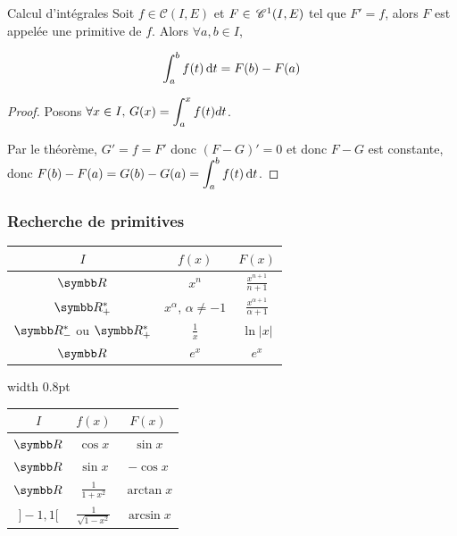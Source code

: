 \begin{corollaire}{Calcul d'intégrales}{}
    Soit $f \in \mathscr C(I, E)$ et $F \in \,\mathscr C^{1}(I, E)$ tel que 
    $F' = f$, alors $F$ est appelée une primitive de $f$. Alors $\forall a, b \in I$, 
    
    \[\displaystyle \int_a^b f(t) \,\mathrm{d}t = F(b) - F(a)\]
\end{corollaire}


\begin{proof}
    Posons $\displaystyle \forall x \in I, \, G(x) = \int_a^x f(t) dt$.

    Par le théorème, $G' = f = F'$ donc $(F - G)' = 0$ et donc $F - G$ est constante, 
    donc $\displaystyle F(b) - F(a) = G(b) - G(a) = \int_a^b f(t) \,\mathrm{d}t$.
\end{proof}

\subsubsection{Recherche de primitives}
\begin{table}[htpb]
\centering
\renewcommand{\arraystretch}{1.6}
\begin{minipage}[t]{0.44\linewidth}
    \centering
    \begin{tabular}{ccc}
        \toprule
        $I$ & $f(x)$ & $F(x)$ \\
        \midrule
        $\R$     & $x^n$         & $\frac{x^{n+1}}{n+1}$ \\
        $\R^*_+$ & $x^\alpha$, $\alpha \not = -1$   & $\frac{x^{\alpha+1}}{\alpha+1}$ \\
        $\R^*_-$ ou $\R^*_+$   & $\frac{1}{x}$ & $\ln|x|$ \\
        $\R$     & $e^x$         & $e^x$ \\
        \bottomrule
    \end{tabular}
\end{minipage}
\hfill
{\color{black!50}\vrule width 0.8pt}%
\hfill
\begin{minipage}[t]{0.44\linewidth}
    \centering
    \begin{tabular}{ccc}
        \toprule
        $I$ & $f(x)$ & $F(x)$ \\
        \midrule
        $\R$      & $\cos x$                  & $\sin x$ \\
        $\R$      & $\sin x$                  & $-\cos x$ \\
        $\R$      & $\frac{1}{1+x^2}$         & $\arctan x$ \\
        $]-1, 1[$ & $\frac{1}{\sqrt{1-x^2}}$  & $\arcsin x$ \\
        \bottomrule
    \end{tabular}
\end{minipage}
\end{table}


